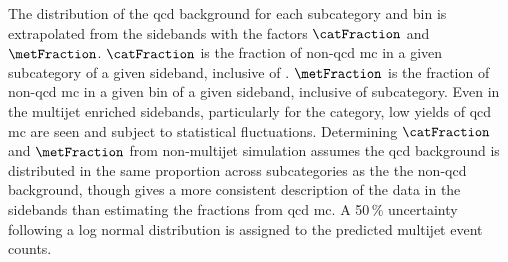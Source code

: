 The distribution of the \acrshort{qcd} background for each subcategory and \ptmiss bin is extrapolated from the sidebands with the factors $\catFraction$ and $\metFraction$. $\catFraction$ is the fraction of non-\acrshort{qcd} \acrshort{mc} in a given subcategory of a given sideband, inclusive of \ptmiss. $\metFraction$ is the fraction of non-\acrshort{qcd} \acrshort{mc} in a given \ptmiss bin of a given sideband, inclusive of subcategory. Even in the multijet enriched sidebands, particularly for the \ttH category, low yields of \acrshort{qcd} \acrshort{mc} are seen and subject to statistical fluctuations. Determining $\catFraction$ and $\metFraction$ from non-multijet simulation assumes the \acrshort{qcd} background is distributed in the same proportion across subcategories as the the non-\acrshort{qcd} background, though gives a more consistent description of the data in the sidebands than estimating the fractions from \acrshort{qcd} \acrshort{mc}. A 50\,\% uncertainty following a log normal distribution is assigned to the predicted multijet event counts.
